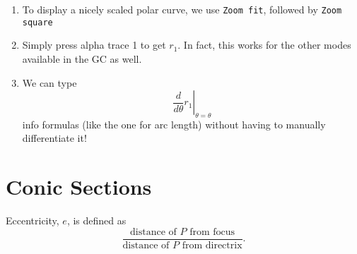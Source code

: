 \documentclass[oneside]{book}
\begin{document}
\begin{GCSkills}{}
  \begin{enumerate}
    \item To display a nicely scaled polar curve, we use \texttt{Zoom fit}, followed by \texttt{Zoom square}
    \item Simply press alpha trace 1 to get \(r_1\). In fact, this works for the other modes available in the GC as well. 
    \item We can type 
    \[\left. \frac{d}{d\theta}{r_1} \right\rvert_{\theta=\theta}\] 
    info formulas (like the one for arc length) without having to manually differentiate it!
  \end{enumerate}
\end{GCSkills}

\chapter{Conic Sections}
\begin{definition}{}{}
  Eccentricity, \(e\), is defined as 
  \[\frac{\text{distance of \(P\) from focus}}{\text{distance of \(P\) from directrix}}.\]
\end{definition}
\end{document}
